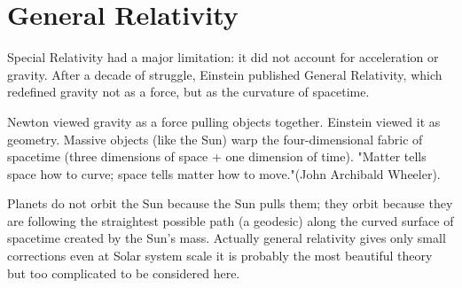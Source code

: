 \section{General Relativity}
\label{general_relativity}
Special Relativity had a major limitation: it did not account 
for acceleration or gravity. After a decade of struggle, 
Einstein published General Relativity, which redefined 
gravity not as a force, but as the curvature of spacetime.

Newton viewed gravity as a force pulling objects together. 
Einstein viewed it as geometry. Massive objects (like the Sun) 
warp the four-dimensional fabric of spacetime 
(three dimensions of space + one dimension of time).
"Matter tells space how to curve; space tells matter how to move."(John Archibald Wheeler).

Planets do not orbit the Sun because the Sun pulls them; 
they orbit because they are following the straightest possible path 
(a geodesic) along the curved surface of spacetime created by the Sun's mass.
Actually general relativity gives only small corrections even 
at Solar system scale it is probably the most beautiful theory but too
complicated to be considered here. 


